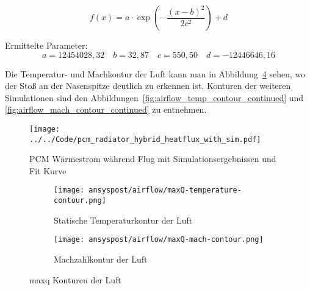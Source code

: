 \begin{equation*}
f(x) = a \cdot \exp\!\left(-\frac{(x-b)^2}{2c^2}\right) + d
\end{equation*}

Ermittelte Parameter:
\begin{equation*}
  a=12454028,32 \quad b=32,87 \quad c=550,50 \quad d=-12446646,16
\end{equation*}

\newpage

Die Temperatur- und Machkontur der Luft kann man in Abbildung~\ref{fig:maxQ_konturen} sehen, wo der Stoß an der Nasenspitze
deutlich zu erkennen ist. Konturen der weiteren Simulationen sind den Abbildungen~\ref{fig:airflow_temp_contour_continued}
und \ref{fig:airflow_mach_contour_continued} zu entnehmen.

\begin{figure}
  \centering
  \texttt{[image: ../../Code/pcm\_radiator\_hybrid\_heatflux\_with\_sim.pdf]}
  \caption{PCM Wärmestrom während Flug mit Simulationsergebnissen und Fit Kurve}\label{fig:pcm_waermestrom_sim}
\end{figure}

\begin{figure}
    \centering

    \begin{subfigure}{\textwidth}
        \centering
        \texttt{[image: ansyspost/airflow/maxQ-temperature-contour.png]}
        \caption{Statische Temperaturkontur der Luft}
        \label{fig:maxQ_temp_contour}
    \end{subfigure}

    \begin{subfigure}{\textwidth}
        \centering
        \texttt{[image: ansyspost/airflow/maxQ-mach-contour.png]}
        \caption{Machzahlkontur der Luft}
        \label{fig:maxQ_mach_contour}
    \end{subfigure}

    \caption{\texorpdfstring{\ac{maxq}}{max Q} Konturen der Luft}
    \label{fig:maxQ_konturen}
\end{figure}